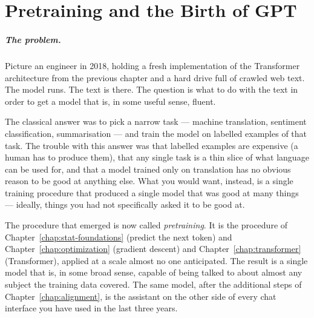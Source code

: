 
\chapter{Pretraining and the Birth of GPT}
\label{chap:pretraining}
\label{ntg:ch6}

\scenelabel
\begin{scenestrip}
\end{scenestrip}

\paragraph{The problem.} Picture an engineer in 2018, holding a fresh implementation of
the Transformer architecture from the previous chapter and a
hard drive full of crawled web text. The model runs. The text
is there. The question is what to do with the text in order to
get a model that is, in some useful sense, fluent.

The classical answer was to pick a narrow task --- machine
translation, sentiment classification, summarisation --- and
train the model on labelled examples of that task. The trouble
with this answer was that labelled examples are expensive (a
human has to produce them), that any single task is a thin
slice of what language can be used for, and that a model
trained only on translation has no obvious reason to be good at
anything else. What you would want, instead, is a single
training procedure that produced a single model that was good
at many things --- ideally, things you had not specifically
asked it to be good at.

The procedure that emerged is now called \emph{pretraining}. It
is the procedure of Chapter~\ref{chap:stat-foundations} (predict the next token) and
Chapter~\ref{chap:optimization} (gradient descent) and Chapter~\ref{chap:transformer} (Transformer),
applied at a scale almost no one anticipated. The result is a
single model that is, in some broad sense, capable of being
talked to about almost any subject the training data covered.
The same model, after the additional steps of Chapter~\ref{chap:alignment}, is
the assistant on the other side of every chat interface you
have used in the last three years.

